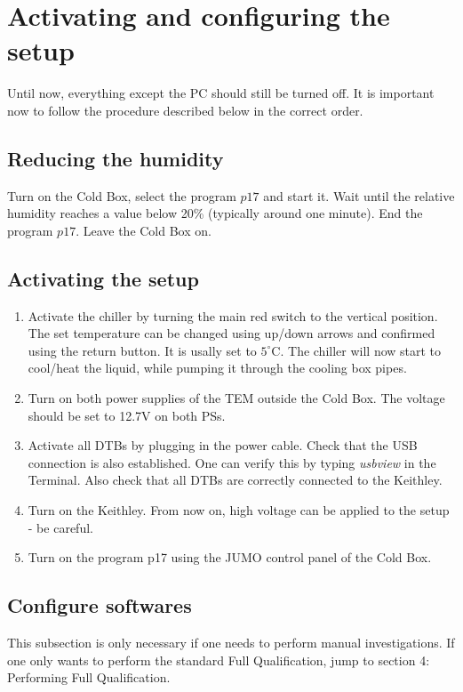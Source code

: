 \documentclass[fleqn,10pt]{SelfArx} %
\begin{document}
\section{Activating and configuring the setup}
Until now, everything except the PC should still be turned off. It is important now to follow the procedure described below in the correct order. 

\subsection{Reducing the humidity}
Turn on the Cold Box, select the program $p17$ and start it. Wait until the relative humidity reaches a value below 20\% (typically around one minute). End the program $p17$. Leave the Cold Box on.

\subsection{Activating the setup}
\begin{enumerate}
\item Activate the chiller by turning the main red switch to the vertical position. The set temperature can be changed using up/down arrows and confirmed using the return button. It is usally set to $5^\circ$C. The chiller will now start to cool/heat the liquid, while pumping it through the cooling box pipes. 
\item Turn on both power supplies of the TEM outside the Cold Box. The voltage should be set to 12.7V on both PSs. 
\item Activate all DTBs by plugging in the power cable. Check that the USB connection is also established. One can verify this by typing {\it usbview} in the Terminal. Also check that all DTBs are correctly connected to the Keithley. 
\item Turn on the Keithley. From now on, high voltage can be applied to the setup - be careful.
\item Turn on the program p17 using the JUMO control panel of the Cold Box. 
\end{enumerate}

\subsection{Configure softwares}
This subsection is only necessary if one needs to perform manual investigations. If one only wants to perform the standard Full Qualification, jump to section 4: Performing Full Qualification.
\end{document}
